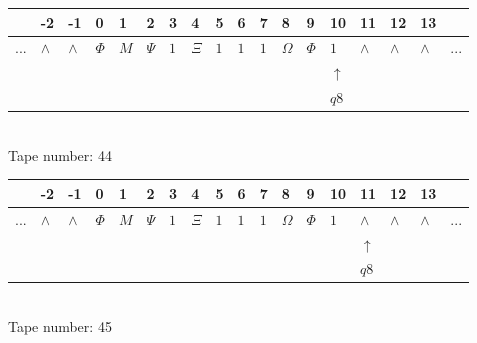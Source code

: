 \documentclass[11pt]{article}
\begin{document}
\begin{table}[H]
\centering
\begin{tabular}{llllllllllllllllll}
 & -2 & -1 & 0 & 1 & 2 & 3 & 4 & 5 & 6 & 7 & 8 & 9 & 10 & 11 & 12 & 13 & \\
\hline
$...$ & \multicolumn{1}{|l|}{$\wedge$} & \multicolumn{1}{|l|}{$\wedge$} & \multicolumn{1}{|l|}{$\Phi$} & \multicolumn{1}{|l|}{$M$} & \multicolumn{1}{|l|}{$\Psi$} & \multicolumn{1}{|l|}{$1$} & \multicolumn{1}{|l|}{$\Xi$} & \multicolumn{1}{|l|}{$1$} & \multicolumn{1}{|l|}{$1$} & \multicolumn{1}{|l|}{$1$} & \multicolumn{1}{|l|}{$\Omega$} & \multicolumn{1}{|l|}{$\Phi$} & \multicolumn{1}{|l|}{$1$} & \multicolumn{1}{|l|}{$\wedge$} & \multicolumn{1}{|l|}{$\wedge$} & \multicolumn{1}{|l|}{$\wedge$} & $...$\\
\hline
&  &  &  &  &  &  &  &  &  &  &  &  & $\uparrow$ &  &  &  &  \\
&  &  &  &  &  &  &  &  &  &  &  &  & $ q8 $ &  &  &  &  \\
\end{tabular}
\\
Tape number: 44
\noindent\makebox[\linewidth]{\hdashrule{\textwidth}{1pt}{1pt}}\end{table}

\begin{table}[H]
\centering
\begin{tabular}{llllllllllllllllll}
 & -2 & -1 & 0 & 1 & 2 & 3 & 4 & 5 & 6 & 7 & 8 & 9 & 10 & 11 & 12 & 13 & \\
\hline
$...$ & \multicolumn{1}{|l|}{$\wedge$} & \multicolumn{1}{|l|}{$\wedge$} & \multicolumn{1}{|l|}{$\Phi$} & \multicolumn{1}{|l|}{$M$} & \multicolumn{1}{|l|}{$\Psi$} & \multicolumn{1}{|l|}{$1$} & \multicolumn{1}{|l|}{$\Xi$} & \multicolumn{1}{|l|}{$1$} & \multicolumn{1}{|l|}{$1$} & \multicolumn{1}{|l|}{$1$} & \multicolumn{1}{|l|}{$\Omega$} & \multicolumn{1}{|l|}{$\Phi$} & \multicolumn{1}{|l|}{$1$} & \multicolumn{1}{|l|}{$\wedge$} & \multicolumn{1}{|l|}{$\wedge$} & \multicolumn{1}{|l|}{$\wedge$} & $...$\\
\hline
&  &  &  &  &  &  &  &  &  &  &  &  &  & $\uparrow$ &  &  &  \\
&  &  &  &  &  &  &  &  &  &  &  &  &  & $ q8 $ &  &  &  \\
\end{tabular}
\\
Tape number: 45
\noindent\makebox[\linewidth]{\hdashrule{\textwidth}{1pt}{1pt}}\end{table}
\end{document}
